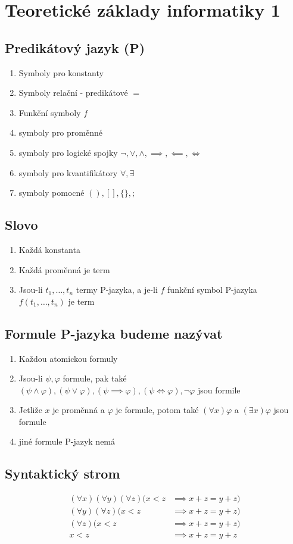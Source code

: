 


  \section*{Teoretické základy informatiky 1}

  \subsection*{Predikátový jazyk (P)}
  \begin{enumerate}
    \item  Symboly pro konstanty
    \item Symboly relační - predikátové $=$
    \item Funkční symboly $f$
    \item symboly pro proměnné
    \item symboly pro logické spojky $\neg, \lor, \land, \implies, \impliedby, \iff$
    \item symboly pro kvantifikátory $\forall, \exists$
    \item symboly pomocné $\left(\right), [] , \{\},;$
  \end{enumerate}
 

  \subsection*{Slovo}
  \begin{enumerate}
    \item Každá konstanta
    \item Každá proměnná je term
    \item Jsou-li $t_1, \dots , t_n$ termy P-jazyka, a je-li $f$ funkční symbol P-jazyka $f(t_1, \dots, t_n)$ je term
  \end{enumerate}

  \subsection*{Formule P-jazyka budeme nazývat}
  \begin{enumerate}
    \item Každou atomickou formuly
    \item Jsou-li $\psi, \varphi$ formule, pak také $(\psi \land \varphi), (\psi \lor \varphi), (\psi \implies \varphi), (\psi \iff \varphi), \neg \varphi$ jsou formile
    \item Jetliže $x$ je proměnná a $\varphi$ je formule, potom také $(\forall x)\varphi$ a $(\exists x)\varphi$ jsou formule
    \item jiné formule P-jazyk nemá
  \end{enumerate}

  \subsection*{Syntaktický strom}
  \begin{align*}
    (\forall x)(\forall y)(\forall z)(x<z  &\implies x+z=y+z)
    \\(\forall y)(\forall z)(x<z  &\implies x+z=y+z)
    \\(\forall z)(x<z  &\implies x+z=y+z)
    \\x<z  &\implies x+z=y+z
\end{align*}

